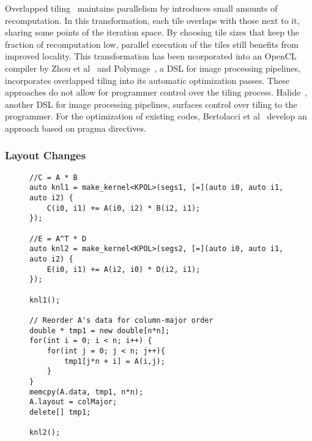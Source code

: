 Overlapped tiling~\cite{holewinski2012high,krishnamoorthy2007effective} maintains parallelism by introduces small amounts of recomputation.
In this transformation, each tile overlaps with those next to it, sharing some points of the iteration space.
By choosing tile sizes that keep the fraction of recomputation low, parallel execution of the tiles still benefits from improved locality.
This transformation has been ncorporated into an OpenCL compiler by Zhou et al~\cite{zhou2012hierarchical} and Polymage~\cite{mullapudi2015polymage}, a DSL for image processing pipelines, incorporates overlapped tiling into its automatic optimization passes.
These approaches do not allow for programmer control over the tiling process.
Halide~\cite{ragan-kelley2013halide}, another DSL for image processing pipelines, surfaces control over tiling to the programmer.
For the optimization of existing codes, Bertolacci et al~\cite{bertolacci2019using} develop an approach based on pragma directives.

\subsubsection{Layout Changes}
\begin{figure}
\begin{lstlisting}[caption={Changing a View's data layout between computations by hand.},label={FormatChangeByHand}]
//C = A * B
auto knl1 = make_kernel<KPOL>(segs1, [=](auto i0, auto i1, auto i2) {
	C(i0, i1) += A(i0, i2) * B(i2, i1);
});

//E = A^T * D
auto knl2 = make_kernel<KPOL>(segs2, [=](auto i0, auto i1, auto i2) {
	E(i0, i1) += A(i2, i0) * D(i2, i1);
});

knl1();

// Reorder A's data for column-major order
double * tmp1 = new double[n*n];
for(int i = 0; i < n; i++) {
	for(int j = 0; j < n; j++){
		tmp1[j*n + i] = A(i,j);
	}
}
memcpy(A.data, tmp1, n*n);
A.layout = colMajor;
delete[] tmp1;

knl2();
\end{lstlisting}
\end{figure}

